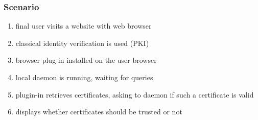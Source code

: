 \begin{frame}
	\frametitle{Scenario}
	\begin{alertblock}{}
		\begin{enumerate}
			\item final user visits a website with web browser
			\item classical identity verification is used (PKI)
			\item browser plug-in installed on the user browser
			\item local daemon is running, waiting for queries
			\item plugin-in retrieves certificates, asking to daemon if such a certificate is valid
			\item displays whether certificates should be trusted or not
		\end{enumerate}
	\end{alertblock}
\end{frame}